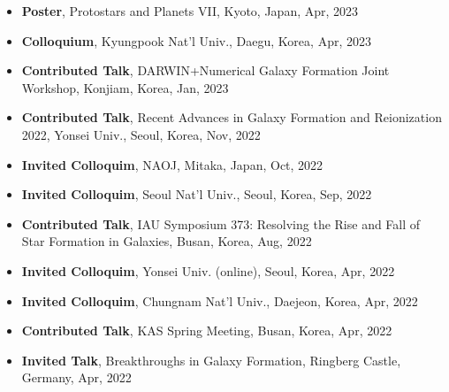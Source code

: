 \documentclass[11pt,letterpaper,roman]{moderncv}        %
\begin{document}
\begin{itemize}
\item \textbf{Poster},
  Protostars and Planets VII, Kyoto, Japan, Apr, 2023 %
\item \textbf{Colloquium},
  Kyungpook Nat'l Univ., Daegu, Korea, Apr, 2023 %
\item \textbf{Contributed Talk},
  DARWIN+Numerical Galaxy Formation Joint Workshop, Konjiam, Korea, Jan, 2023 %
\item \textbf{Contributed Talk},
  Recent Advances in Galaxy Formation and Reionization 2022, Yonsei Univ., Seoul, Korea, Nov, 2022 %
\item \textbf{Invited Colloquim},
  NAOJ, Mitaka, Japan, Oct, 2022 %
\item \textbf{Invited Colloquim},
  Seoul Nat'l Univ., Seoul, Korea, Sep, 2022 %
\item \textbf{Contributed Talk},
  IAU Symposium 373: Resolving the Rise and Fall of Star Formation in Galaxies, Busan, Korea, Aug, 2022 %
\item \textbf{Invited Colloquim},
  Yonsei Univ. (online), Seoul, Korea, Apr, 2022 %
\item \textbf{Invited Colloquim},
  Chungnam Nat'l Univ., Daejeon, Korea, Apr, 2022 %
\item \textbf{Contributed Talk},
  KAS Spring Meeting, Busan, Korea, Apr, 2022 %
\item \textbf{Invited Talk},
  Breakthroughs in Galaxy Formation, Ringberg Castle, Germany, Apr, 2022 %

\end{itemize}
\end{document}
